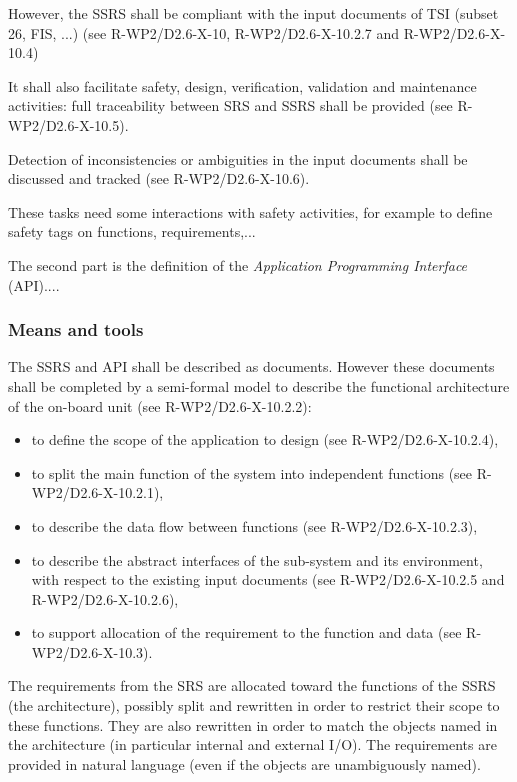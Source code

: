 However, the SSRS shall be compliant with the input documents of TSI (subset 26, FIS, ...) (see R-WP2/D2.6-X-10, R-WP2/D2.6-X-10.2.7 and R-WP2/D2.6-X-10.4)

It shall also facilitate safety, design, verification, validation and maintenance activities: full traceability between SRS and SSRS shall be provided (see R-WP2/D2.6-X-10.5).

Detection of inconsistencies or ambiguities in the input documents shall be discussed and tracked (see R-WP2/D2.6-X-10.6).

These tasks need some interactions with safety activities, for example to define safety tags on functions, requirements,...

The second part is the definition of the \textit{Application Programming Interface} (API)....

\tbd

\subsubsection{Means and tools}

The SSRS and API shall be described as documents.
However these documents shall be completed by a semi-formal model to describe the functional architecture of the on-board unit (see R-WP2/D2.6-X-10.2.2):

\begin{itemize}
\item to  define the scope of the application to design (see R-WP2/D2.6-X-10.2.4),
\item to split the main function of the system into independent functions (see R-WP2/D2.6-X-10.2.1),
\item to describe the data flow between functions (see R-WP2/D2.6-X-10.2.3),
\item to describe the abstract interfaces of the sub-system and its environment, with respect to the existing input documents (see R-WP2/D2.6-X-10.2.5 and R-WP2/D2.6-X-10.2.6),
\item to  support allocation of the requirement to  the function and data (see R-WP2/D2.6-X-10.3).
\end{itemize}

The requirements from the SRS are allocated toward the
functions of the SSRS (the architecture), possibly split and rewritten in order to restrict their scope to these
functions. They are also rewritten in order to match the objects named in
the architecture (in particular internal and external I/O). The requirements are provided in natural language
(even if the objects are unambiguously named).

